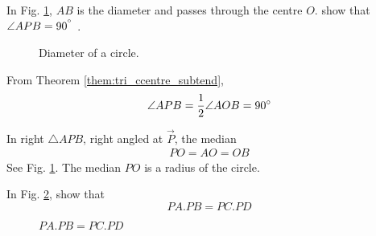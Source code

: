 %
\iffalse
\item
In Fig. \ref{fig:circ_dia_rt}, $AB$ is the diameter and passes through the centre $O$.  show that $\angle APB = 90^{\degree}$ .

%
\begin{figure}[!ht]
	\begin{center}
		
		\resizebox{\columnwidth}{!}{}
	\end{center}
	\caption{Diameter of a circle.}
	\label{fig:circ_dia_rt}	
\end{figure}
%
\solution From Theorem \ref{them:tri_ccentre_subtend}, 
\begin{align}
\angle APB = \frac{1}{2}\angle AOB = 90\degree
\end{align}
%
\item In  right $\triangle APB$, right angled at $\vec{P}$, the median 
\begin{align}
PO = AO = OB
\end{align}
%
\solution See Fig. \ref{fig:circ_dia_rt}. The median $PO$ is a radius of the circle.
\item
	In Fig. \ref{fig:circ_chord_prod}, show that 
	\begin{equation}
	PA.PB = PC.PD
	\end{equation}
\begin{figure}[!ht]
	\begin{center}
		
		\resizebox{\columnwidth}{!}{}
	\end{center}
	\caption{$PA.PB = PC.PD$}
	\label{fig:circ_chord_prod}	
\end{figure}

